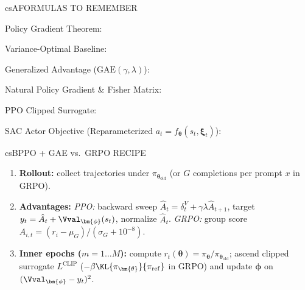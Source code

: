 \documentclass[../../../../master.tex]{subfiles}
\begin{document}
\csnextpage

\begin{cscolumns}
\begin{cscard}{csA}{FORMULAS TO REMEMBER}
  \begin{csbul}
    \item Policy Gradient Theorem:
    \item Variance-Optimal Baseline:
    \item Generalized Advantage ($\mathrm{GAE}(\gamma,\lambda)$):
    \item Natural Policy Gradient \& Fisher Matrix:
    \item PPO Clipped Surrogate:
    \item SAC Actor Objective (Reparameterized $a_t=f_{\bm{\theta}}(s_t,\bm{\xi}_t)$):
  \end{csbul}
\end{cscard}

\begin{cscard}{csB}{PPO + GAE vs.\ GRPO RECIPE}
  \begin{enumerate}[leftmargin=1.2em, itemsep=1pt, topsep=1pt, parsep=0pt]
    \item \textbf{Rollout:} collect trajectories under $\pi_{\bm{\theta}_{\mathrm{old}}}$ (or $G$ completions per prompt $x$ in GRPO).
    \item \textbf{Advantages:}
      \emph{PPO:} backward sweep $\hat{A}_t=\delta_t^V+\gamma\lambda\hat{A}_{t+1}$, target $y_t=\hat{A}_t+\Vval_{\bm{\phi}}(s_t)$, normalize $\hat{A}_t$.
      \emph{GRPO:} group score $A_{i,t}=(r_i-\mu_G)/(\sigma_G+10^{-8})$.
    \item \textbf{Inner epochs ($m=1\dots M$):} compute $r_t(\bm{\theta})=\pi_{\bm{\theta}}/\pi_{\bm{\theta}_{\mathrm{old}}}$; ascend clipped surrogate $L^{\mathrm{CLIP}}$ ($-\beta\KL{\pi_{\bm{\theta}}}{\pi_{\mathrm{ref}}}$ in GRPO) and update $\bm{\phi}$ on $(\Vval_{\bm{\phi}}-y_t)^2$.
  \end{enumerate}
\end{cscard}
\columnbreak


\end{cscolumns}
\end{document}
